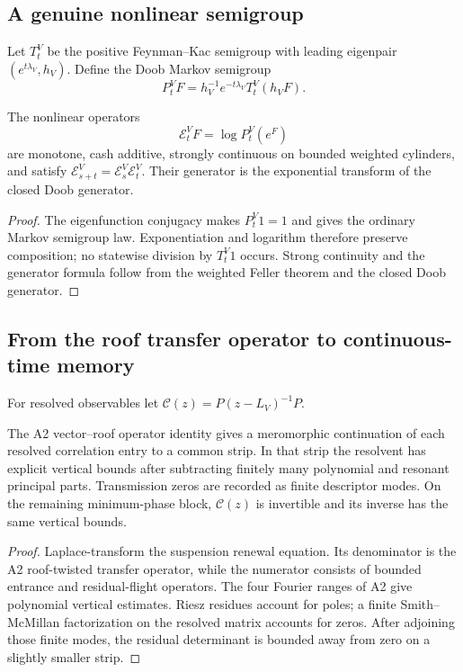 \subsection{A genuine nonlinear semigroup}
Let $T_t^V$ be the positive Feynman--Kac semigroup with leading eigenpair
$(e^{t\lambda_V},h_V)$.  Define the Doob Markov semigroup
\[
 P_t^V F=h_V^{-1}e^{-t\lambda_V}T_t^V(h_VF).
\]

\begin{theorem}
\label{thm:r11-a4-doob}
The nonlinear operators
\[
 \mathcal E_t^V F=\log P_t^V(e^F)
\]
are monotone, cash additive, strongly continuous on bounded weighted
cylinders, and satisfy
$\mathcal E_{s+t}^V=\mathcal E_s^V\mathcal E_t^V$.
Their generator is the exponential transform of the closed Doob generator.
\end{theorem}

\begin{proof}
The eigenfunction conjugacy makes $P_t^V1=1$ and gives the ordinary Markov
semigroup law.  Exponentiation and logarithm therefore preserve composition;
no statewise division by $T_t^V1$ occurs.  Strong continuity and the
generator formula follow from the weighted Feller theorem and the closed
Doob generator.
\end{proof}

\subsection{From the roof transfer operator to continuous-time memory}
For resolved observables let $\mathcal C(z)=P(z-L_V)^{-1}P$.

\begin{theorem}
\label{thm:r11-a4-resolvent}
The A2 vector--roof operator identity gives a meromorphic continuation of each
resolved correlation entry to a common strip.  In that strip the resolvent
has explicit vertical bounds after subtracting finitely many polynomial and
resonant principal parts.  Transmission zeros are recorded as finite
descriptor modes.  On the remaining minimum-phase block, $\mathcal C(z)$ is
invertible and its inverse has the same vertical bounds.
\end{theorem}

\begin{proof}
Laplace-transform the suspension renewal equation.  Its denominator is the
A2 roof-twisted transfer operator, while the numerator consists of bounded
entrance and residual-flight operators.  The four Fourier ranges of A2 give
polynomial vertical estimates.  Riesz residues account for poles; a finite
Smith--McMillan factorization on the resolved matrix accounts for zeros.
After adjoining those finite modes, the residual determinant is bounded away
from zero on a slightly smaller strip.
\end{proof}

